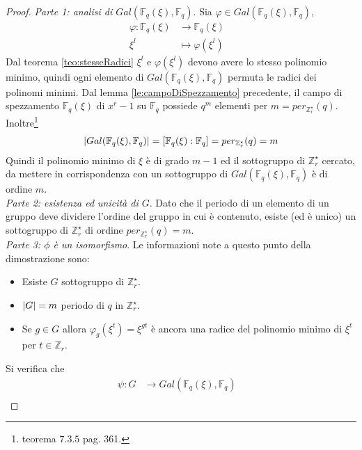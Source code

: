 \begin{proof}
   \emph{Parte 1: analisi di $Gal(\mathbb{F}_{q}(\xi), \mathbb{F}_{q})$}. Sia $\varphi \in  Gal(\mathbb{F}_{q}(\xi), \mathbb{F}_{q})$,
   \begin{align*}
      \varphi: \mathbb{F}_{q}(\xi) & \longrightarrow  \mathbb{F}_{q}(\xi)&   \\
	    \xi^l &\longmapsto \varphi(\xi^l)
    \end{align*}
   Dal teorema \ref{teo:stesseRadici} $\xi^l$ e $\varphi(\xi^l)$ devono avere lo stesso polinomio minimo, quindi ogni elemento di $Gal(\mathbb{F}_{q}(\xi), \mathbb{F}_{q})$ permuta le radici dei polinomi minimi. Dal lemma \ref{le:campoDiSpezzamento} precedente, il campo di spezzamento $\mathbb{F}_{q}(\xi)$ di $x^r - 1$ su $\mathbb{F}_{q}$ possiede $q^{m}$ elementi per $m = per_{\mathbb{Z}_{r}^{\star}}(q)$. Inoltre\footnote{\cite{cattaneo} teorema $7.3.5$ pag. 361.}
   \begin{align*}
       \arrowvert Gal(\mathbb{F}_{q}(\xi), \mathbb{F}_{q}) \arrowvert = [\mathbb{F}_{q}(\xi): \mathbb{F}_{q}] = per_{\mathbb{Z}_{r}^{\star}}(q) = m
   \end{align*}
   Quindi il polinomio minimo di $\xi$ è di grado $m-1$ ed il sottogruppo di $\mathbb{Z}_{r}^{\star}$ cercato, da mettere in corrispondenza con un sottogruppo di $Gal(\mathbb{F}_{q}(\xi), \mathbb{F}_{q})$ è di ordine $m$.\\
   \emph{Parte 2: esistenza ed unicità di $G$}. Dato che il periodo di un elemento di un gruppo deve dividere l'ordine del gruppo in cui è contenuto, esiste (ed è unico) un sottogruppo di $\mathbb{Z}_{r}^{\star}$ di ordine $per_{\mathbb{Z}_{r}^{\star}}(q) = m$. \\
   \emph{Parte 3: $\phi$ è un isomorfismo}. Le informazioni note a questo punto della dimostrazione sono:
   \begin{itemize}
      \item Esiste $G$ sottogruppo di $\mathbb{Z}_{r}^{\star}$.
      \item $\arrowvert G \arrowvert = m $ periodo di $q$ in $\mathbb{Z}_{r}^{\star}$.
      \item Se $g \in G$ allora $\varphi_{g}(\xi^t) = \xi^{gt}$ è ancora una radice del polinomio minimo di $\xi^{t}$ per $t \in \mathbb{Z}_{r}$.
   \end{itemize}
   Si verifica che
   \begin{align*}
      \psi: G & \longrightarrow  Gal(\mathbb{F}_{q}(\xi), \mathbb{F}_{q}) &   \\

\end{align*}
\end{proof}
